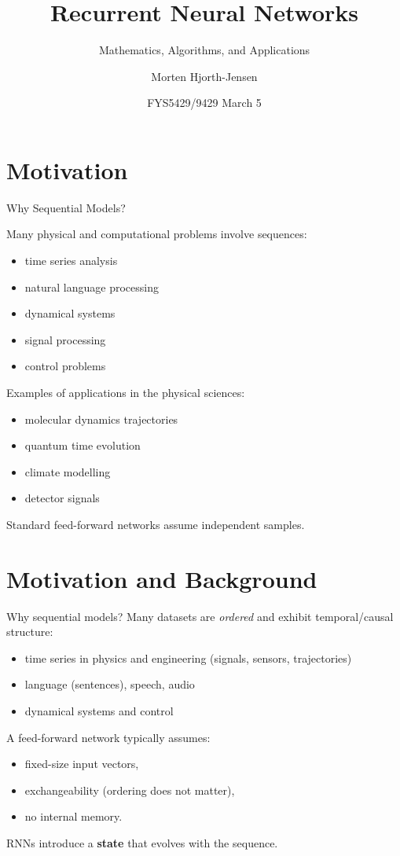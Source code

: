 \documentclass{beamer}
\title{Recurrent Neural Networks}
\subtitle{Mathematics, Algorithms, and Applications}
\author{Morten Hjorth-Jensen}
\date{FYS5429/9429 March 5}
\begin{document}
\frame{\titlepage}

\section{Motivation}

\begin{frame}{Why Sequential Models?}

Many physical and computational problems involve sequences:

\begin{itemize}
\item time series analysis
\item natural language processing
\item dynamical systems
\item signal processing
\item control problems
\end{itemize}

Examples of applications in the physical sciences:

\begin{itemize}
\item molecular dynamics trajectories
\item quantum time evolution
\item climate modelling
\item detector signals
\end{itemize}

Standard feed-forward networks assume independent samples.
\end{frame}

\section{Motivation and Background}

\begin{frame}{Why sequential models?}
Many datasets are \emph{ordered} and exhibit temporal/causal structure:
\begin{itemize}
\item time series in physics and engineering (signals, sensors, trajectories)
\item language (sentences), speech, audio
\item dynamical systems and control
\end{itemize}

A feed-forward network typically assumes:
\begin{itemize}
\item fixed-size input vectors,
\item exchangeability (ordering does not matter),
\item no internal memory.
\end{itemize}

RNNs introduce a \textbf{state} that evolves with the sequence.
\end{frame}
\end{document}
